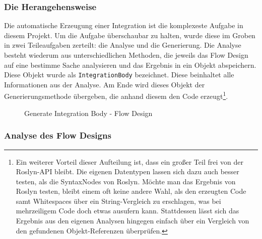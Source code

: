 	\subsubsection{Die Herangehensweise}

	
	Die automatische Erzeugung einer Integration ist die komplexeste Aufgabe in
	diesem Projekt. Um die Aufgabe überschaubar zu halten, wurde diese im Groben in
	zwei Teileaufgaben zerteilt: die Analyse und die Generierung.
	Die Analyse besteht wiederum aus unterschiedlichen Methoden, die jeweils das
	Flow Design auf eine bestimme Sache analysieren und das Ergebnis in ein Objekt
	abspeichern. Diese Objekt wurde als \texttt{IntegrationBody} bezeichnet.
	Diese beinhaltet alle Informationen aus der Analyse. Am Ende wird dieses Objekt
	der Generierungsmethode übergeben, die anhand diesem den Code erzeugt\footnote{Ein weiterer Vorteil dieser Aufteilung ist, dass ein großer Teil frei von der Roslyn-API bleibt. Die eigenen Datentypen lassen sich dazu auch besser testen, als die SyntaxNodes von Roslyn. Möchte man das Ergebnis von Roslyn testen, bleibt einem  oft keine andere Wahl, als den erzeugten Code samt Whitespaces über ein String-Vergleich zu erschlagen, was bei mehrzeiligem Code doch etwas ausufern kann. Stattdessen lässt sich das Ergebnis aus den eigenen Analysen hingegen einfach über ein Vergleich von den gefundenen Objekt-Referenzen überprüfen.}.
	
\begin{landscape}
	\begin{figure}
		\thispagestyle{empty}
		\vspace*{-1.5cm}
		\hspace*{-0cm}
		
		\caption{Generate Integration Body - Flow Design}
	\end{figure}
\end{landscape}
	
	\subsubsection{Analyse des Flow Designs}

